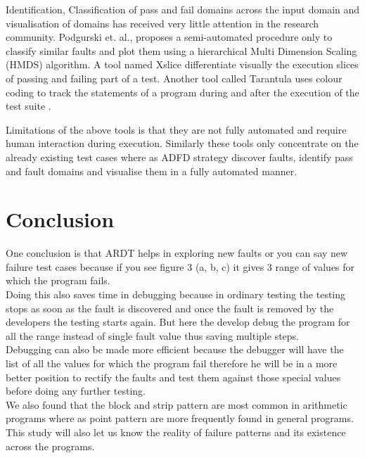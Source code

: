 \documentclass[runningheads,a4paper]{llncs}
\begin{document}
Identification, Classification of pass and fail domains across the input domain and visualisation of domains has received very little attention in the research community. Podgurski et. al., \cite{Podgurski2003} proposes a semi-automated procedure only to classify similar faults and plot them using a hierarchical Multi Dimension Scaling (HMDS) algorithm. A tool named Xslice \cite{Agrawal1995} differentiate visually the execution slices of passing and failing part of a test. Another tool called Tarantula uses colour coding to track the statements of a program during and after the execution of the test suite \cite{Jones2002}.

Limitations of the above tools is that they are not fully automated and require human interaction during execution. Similarly these tools only concentrate on the already existing test cases where as ADFD strategy discover faults, identify pass and fault domains and visualise them in a fully automated manner. 


\section{Conclusion} \label{sec:conclusion}
One conclusion is that ARDT helps in exploring new faults or you can say new failure test cases because if you see figure 3 (a, b, c) it gives 3 range of values for which the program fails. \\

Doing this also saves time in debugging because in ordinary testing the testing stops as soon as the fault is discovered and once the fault is removed by the developers the testing starts again. But here the develop debug the program for all the range instead of single fault value thus saving multiple steps. \\


Debugging can also be made more efficient because the debugger will have the list of all the values for which the program fail therefore he will be in a more better position to rectify the faults and test them against those special values before doing any further testing.\\

We also found that the block and strip pattern are most common in arithmetic programs where as point pattern are more frequently found in general programs. \\

This study will also let us know the reality of failure patterns and its existence across the programs.\\
\end{document}
